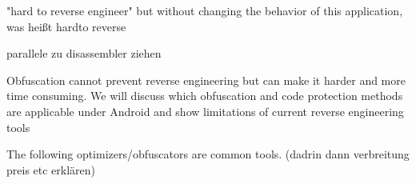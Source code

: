 "hard to reverse engineer" but without changing the behavior of this
application, was heißt hardto reverse\newline

parallele zu disassembler ziehen\newline

Obfuscation cannot prevent reverse engineering but can make it harder and more time consuming. We will discuss which obfuscation and code protection methods are applicable under Android and show limitations of current reverse engineering tools\newline

The following optimizers/obfuscators are common tools. (dadrin dann verbreitung preis etc erklären)
